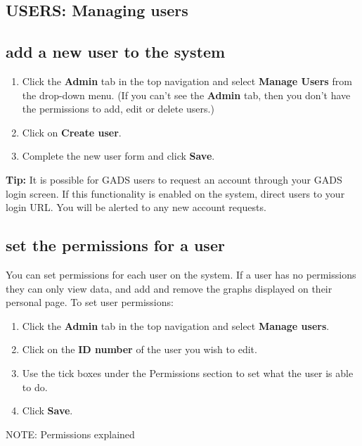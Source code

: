 \documentclass{ctrlo-int-toc}
\begin{document}
\begin{admin}
\clearpage\section[USERS: Managing users ]{USERS: Managing users }
\subsection[add a new user to the system ]{add a new user to the system }
\begin{enumerate}
\item Click the \textbf{Admin} tab in the top navigation and select \textbf{Manage Users} from the drop-down menu. (If you can't see the \textbf{Admin} tab, then you don't have the permissions to add, edit or delete users.)
\item Click on \textbf{Create user}.
\item Complete the new user form and click \textbf{Save}.
\end{enumerate}
\begin{tipbox}[userdefinedwidth=15cm]
\textbf{Tip:} It is possible for GADS users to request an account through your GADS login screen. If this functionality is enabled on the system, direct users to your login URL. You will be alerted to any new account requests. \ 
\end{tipbox}

\bigskip

\subsection[set the permissions for a user]{set the permissions for a user}
\label{subsec:userperms}
You can set permissions for each user on the system. If a user has no permissions they can only view data, and add and remove the graphs displayed on their personal page. To set user permissions:
\begin{enumerate}
    \item Click the \textbf{Admin} tab in the top navigation and select \textbf{Manage users}.
    \item Click on the \textbf{ID number} of the user you wish to edit.
    \item Use the tick boxes under the Permissions section to set what the user is able to do.
    \item Click \textbf{Save}.
\end{enumerate}

\begin{notebox}
    NOTE: Permissions explained
\end{notebox}


\end{admin}
\end{document}
